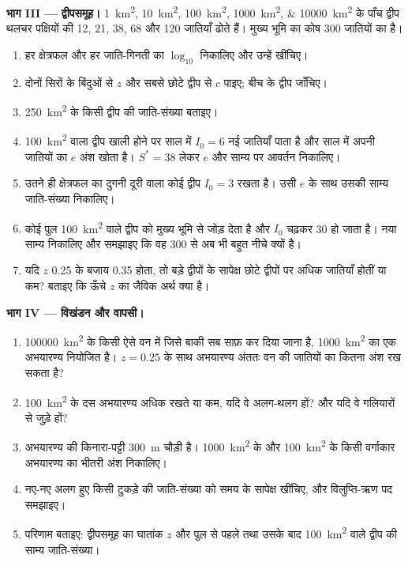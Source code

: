 \begin{problem}
\medskip
\noindent\textbf{भाग III --- द्वीपसमूह।}
\qtylist{1;10;100;1000;10000}{km^2} के पाँच द्वीप थलचर पक्षियों की \num{12}, \num{21}, \num{38}, \num{68} और
\num{120} जातियाँ ढोते हैं। मुख्य भूमि का कोष \num{300}
जातियों का है।
\begin{enumerate}[resume]
  \item हर क्षेत्रफल और हर जाति-गिनती का $\log_{10}$ निकालिए और उन्हें
        खींचिए।
  \item दोनों सिरों के बिंदुओं से $z$ और सबसे छोटे द्वीप से $c$ पाइए;
        बीच के द्वीप जाँचिए।
  \item \qty{250}{km^2} के किसी द्वीप की जाति-संख्या बताइए।
  \item \qty{100}{km^2} वाला द्वीप खाली होने पर साल में $I_0 = 6$ नई
        जातियाँ पाता है और साल में अपनी जातियों का $e$ अंश खोता है।
        $S^* = 38$ लेकर $e$ और साम्य पर आवर्तन निकालिए।
  \item उतने ही क्षेत्रफल का दुगनी दूरी वाला कोई द्वीप $I_0 = 3$ रखता है।
        उसी $e$ के साथ उसकी साम्य जाति-संख्या निकालिए।
  \item कोई पुल \qty{100}{km^2} वाले द्वीप को मुख्य भूमि से जोड़ देता है
        और $I_0$ चढ़कर \num{30} हो जाता है। नया साम्य निकालिए और
        समझाइए कि वह \num{300} से अब भी बहुत नीचे क्यों है।
  \item यदि $z$ \num{0.25} के बजाय \num{0.35} होता, तो बड़े द्वीपों के
        सापेक्ष छोटे द्वीपों पर अधिक जातियाँ होतीं या कम? बताइए कि ऊँचे
        $z$ का जैविक अर्थ क्या है।
\end{enumerate}

\medskip
\noindent\textbf{भाग IV --- विखंडन और वापसी।}
\begin{enumerate}[resume]
  \item \qty{100000}{km^2} के किसी ऐसे वन में जिसे बाकी सब साफ़ कर दिया
        जाना है, \qty{1000}{km^2} का एक अभयारण्य नियोजित है। $z =
        0.25$ के साथ अभयारण्य अंततः वन की जातियों का कितना अंश रख
        सकता है?
  \item \qty{100}{km^2} के दस अभयारण्य अधिक रखते या कम, यदि वे अलग-थलग
        हों? और यदि वे गलियारों से जुड़े हों?
  \item अभयारण्य की किनारा-पट्टी \qty{300}{m} चौड़ी है।
        \qty{1000}{km^2} के और \qty{100}{km^2} के किसी वर्गाकार
        अभयारण्य का भीतरी अंश निकालिए।
  \item नए-नए अलग हुए किसी टुकड़े की जाति-संख्या को समय के सापेक्ष
        खींचिए, और विलुप्ति-ऋण पद समझाइए।
  \item परिणाम बताइए: द्वीपसमूह का घातांक $z$ और पुल से पहले तथा उसके
        बाद \qty{100}{km^2} वाले द्वीप की साम्य जाति-संख्या।
\end{enumerate}
\end{problem}
